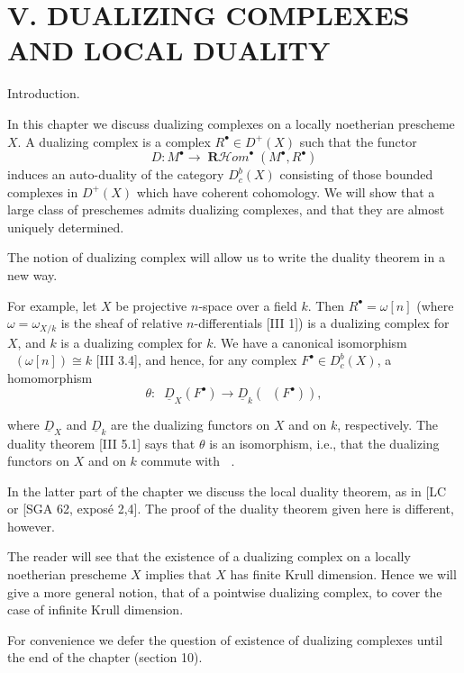 \documentclass[12pt]{book}
\DeclareMathOperator{\Rfst}{\mathbf{R}f_*}
\DeclareMathOperator{\RHom}{\mathbf{R}\mathcal{H}\textit{om}}
\begin{document}
\setcounter{page}{252}
\chapter{V. DUALIZING COMPLEXES AND LOCAL DUALITY}

Introduction.

In this chapter we discuss dualizing complexes on a locally noetherian prescheme \(X\).
A dualizing complex is a complex \(R^{\bullet} \in D^{+}(X)\) such that the functor
\[
D: M^{\bullet} \to \RHom^{\bullet}\left(M^{\bullet}, R^{\bullet}\right)
\]
induces an auto-duality of the category \(D_{c}^{b}(X)\) consisting of those bounded complexes in \(D^{+}(X)\) which have coherent cohomology.
We will show that a large class of preschemes admits dualizing complexes, and that they are almost uniquely determined.

The notion of dualizing complex will allow us to write the duality theorem in a new way.

For example, let \(X\) be projective \(n\)-space over a field \(k\).
Then \(R^{\bullet}=\omega[n]\) (where \(\omega=\omega_{X/k}\) is the sheaf of relative \(n\)-differentials [III 1])
is a dualizing complex for \(X\), and \(k\) is a dualizing complex for \(k\).
We have a canonical isomorphism \(\Rfst(\omega[n]) \cong k\) [III 3.4], and hence, for any complex \(F^{\bullet} \in D_{c}^{b}(X)\), a homomorphism
\[
\theta: \Rfst \underline{D}_{X}\left(F^{\bullet}\right) \to \underline{D}_{k}\left(\Rfst\left(F^{\bullet}\right)\right),
\]

\setcounter{page}{253}
where \(\underline{D}_{X}\) and \(\underline{D}_{k}\) are the dualizing functors on \(X\) and on \(k\), respectively.
The duality theorem [III 5.1] says that \(\theta\) is an isomorphism, i.e., that the dualizing functors on \(X\) and on \(k\) commute with \(\Rfst\).

In the latter part of the chapter we discuss the local duality theorem, as in [LC or [SGA 62, expos\'e 2,4].
The proof of the duality theorem given here is different, however.

The reader will see that the existence of a dualizing complex on a locally noetherian prescheme \(X\) implies that \(X\) has finite Krull dimension.
Hence we will give a more general notion, that of a pointwise dualizing complex, to cover the case of infinite Krull dimension.

For convenience we defer the question of existence of dualizing complexes until the end of the chapter (section 10).
\end{document}
